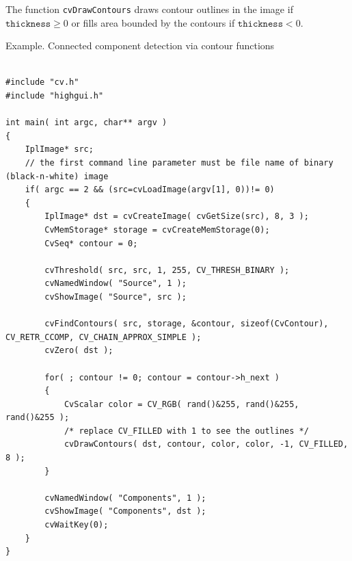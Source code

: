 \begin{description}
\end{description}

The function \texttt{cvDrawContours} draws contour outlines in the image if $\texttt{thickness} \ge 0$ or fills area bounded by the contours if $ \texttt{thickness}<0$.

Example. Connected component detection via contour functions

\begin{lstlisting}

#include "cv.h"
#include "highgui.h"

int main( int argc, char** argv )
{
    IplImage* src;
    // the first command line parameter must be file name of binary (black-n-white) image
    if( argc == 2 && (src=cvLoadImage(argv[1], 0))!= 0)
    {
        IplImage* dst = cvCreateImage( cvGetSize(src), 8, 3 );
        CvMemStorage* storage = cvCreateMemStorage(0);
        CvSeq* contour = 0;

        cvThreshold( src, src, 1, 255, CV_THRESH_BINARY );
        cvNamedWindow( "Source", 1 );
        cvShowImage( "Source", src );

        cvFindContours( src, storage, &contour, sizeof(CvContour), CV_RETR_CCOMP, CV_CHAIN_APPROX_SIMPLE );
        cvZero( dst );

        for( ; contour != 0; contour = contour->h_next )
        {
            CvScalar color = CV_RGB( rand()&255, rand()&255, rand()&255 );
            /* replace CV_FILLED with 1 to see the outlines */
            cvDrawContours( dst, contour, color, color, -1, CV_FILLED, 8 );
        }

        cvNamedWindow( "Components", 1 );
        cvShowImage( "Components", dst );
        cvWaitKey(0);
    }
}

\end{lstlisting}

